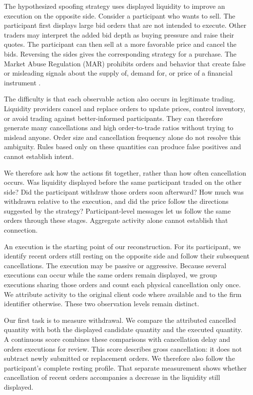 \documentclass[11pt]{article}
\begin{document}
The hypothesized spoofing strategy uses displayed liquidity to improve an execution on the opposite side. Consider a participant who wants to sell. The participant first displays large bid orders that are not intended to execute. Other traders may interpret the added bid depth as buying pressure and raise their quotes. The participant can then sell at a more favorable price and cancel the bids. Reversing the sides gives the corresponding strategy for a purchase. The Market Abuse Regulation (MAR) prohibits orders and behavior that create false or misleading signals about the supply of, demand for, or price of a financial instrument \cite{EU5962014}.

The difficulty is that each observable action also occurs in legitimate trading. Liquidity providers cancel and replace orders to update prices, control inventory, or avoid trading against better-informed participants. They can therefore generate many cancellations and high order-to-trade ratios without trying to mislead anyone. Order size and cancellation frequency alone do not resolve this ambiguity. Rules based only on these quantities can produce false positives and cannot establish intent.

We therefore ask how the actions fit together, rather than how often cancellation occurs. Was liquidity displayed before the same participant traded on the other side? Did the participant withdraw those orders soon afterward? How much was withdrawn relative to the execution, and did the price follow the directions suggested by the strategy? Participant-level messages let us follow the same orders through these stages. Aggregate activity alone cannot establish that connection.

An execution is the starting point of our reconstruction. For its participant, we identify recent orders still resting on the opposite side and follow their subsequent cancellations. The execution may be passive or aggressive. Because several executions can occur while the same orders remain displayed, we group executions sharing those orders and count each physical cancellation only once. We attribute activity to the original client code where available and to the firm identifier otherwise. These two observation levels remain distinct.

Our first task is to measure withdrawal. We compare the attributed cancelled quantity with both the displayed candidate quantity and the executed quantity. A continuous score combines these comparisons with cancellation delay and orders executions for review. This score describes gross cancellation: it does not subtract newly submitted or replacement orders. We therefore also follow the participant's complete resting profile. That separate measurement shows whether cancellation of recent orders accompanies a decrease in the liquidity still displayed.
\end{document}
